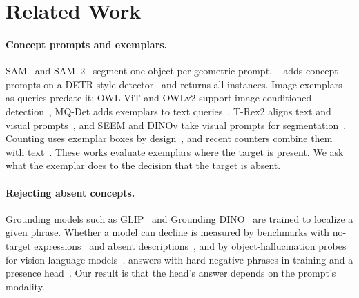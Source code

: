 \section{Related Work}
\label{sec:related}

\paragraph{Concept prompts and exemplars.}
SAM~\cite{kirillov2023sam} and SAM~2~\cite{ravi2024sam2} segment one object per geometric prompt.
\sam{}~\cite{carion2026sam3} adds concept prompts on a DETR-style detector~\cite{carion2020detr} and returns all instances.
Image exemplars as queries predate it: OWL-ViT and OWLv2 support image-conditioned detection~\cite{minderer2022owlvit,minderer2023owlv2}, MQ-Det adds exemplars to text queries~\cite{xu2023mqdet}, T-Rex2 aligns text and visual prompts~\cite{jiang2024trex2}, and SEEM and DINOv take visual prompts for segmentation~\cite{zou2023seem,li2024dinov}.
Counting uses exemplar boxes by design~\cite{ranjan2021fsc}, and recent counters combine them with text~\cite{amini2023countx,amini2024countgd}.
These works evaluate exemplars where the target is present.
We ask what the exemplar does to the decision that the target is absent.

\paragraph{Rejecting absent concepts.}
Grounding models such as GLIP~\cite{li2022glip} and Grounding DINO~\cite{liu2024groundingdino} are trained to localize a given phrase.
Whether a model can decline is measured by benchmarks with no-target expressions~\cite{liu2023gres} and absent descriptions~\cite{xie2023dod}, and by object-hallucination probes for vision-language models~\cite{li2023pope}.
\sam{} answers with hard negative phrases in training and a presence head~\cite{carion2026sam3}.
Our result is that the head's answer depends on the prompt's modality.

